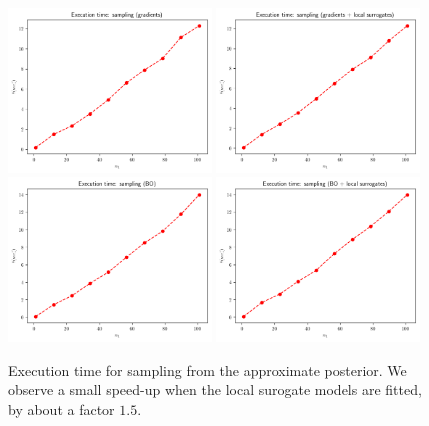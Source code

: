 \begin{figure}[h]
    \begin{center}
      \includegraphics[width=0.48\textwidth]{./Thesis/images/chapter4/exec_sample_grad.png}
      \includegraphics[width=0.48\textwidth]{./Thesis/images/chapter4/exec_sample_grad_fit.png}\\
      \includegraphics[width=0.48\textwidth]{./Thesis/images/chapter4/exec_sample_bo.png}
      \includegraphics[width=0.48\textwidth]{./Thesis/images/chapter4/exec_sample_bo_fit.png}
    \end{center}
    \caption{Execution time for sampling from the approximate
      posterior. We observe a small speed-up when the local surogate
      models are fitted, by about a factor $1.5$.}
  \label{fig:exec_sample}
\end{figure}
